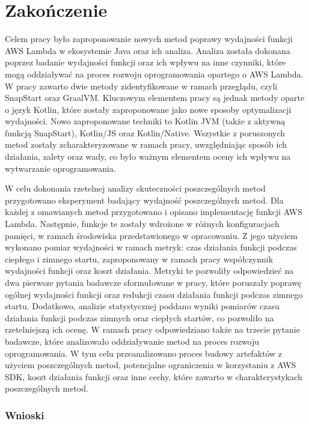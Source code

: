 \chapter*{Zakończenie}\label{chapter:zakonczenie}

Celem pracy było zaproponowanie nowych metod poprawy wydajności funkcji AWS Lambda w ekosystemie Java oraz ich analiza.
Analiza została dokonana poprzez badanie wydajności funkcji oraz ich wpływu na inne czynniki, które mogą oddziaływać na proces rozwoju oprogramowania opartego o AWS Lambda.
W pracy zawarto dwie metody zidentyfikowane w ramach przeglądu, czyli SnapStart oraz GraalVM.
Kluczowym elementem pracy są jednak metody oparte o język Kotlin, które zostały zaproponowane jako nowe sposoby optymalizacji wydajności.
Nowo zaproponowane techniki to Kotlin JVM (także z aktywną funkcją SnapStart), Kotlin/JS oraz Kotlin/Native.
Wszystkie z poruszonych metod zostały zcharakteryzowane w ramach pracy, uwzględniając sposób ich działania, zalety oraz wady, co było ważnym elementem oceny ich wpływu na wytwarzanie oprogramowania.

W celu dokonania rzetelnej analizy skuteczności poszczególnych metod przygotowano eksperyment badający wydajność poszczególnych metod.
Dla każdej z omawianych metod przygotowano i opisano implementację funkcji AWS Lambda.
Następnie, funkcje te zostały wdrożone w różnych konfiguracjach pamięci, w ramach środowiska przedstawionego w opracowaniu.
Z jego użyciem wykonano pomiar wydajności w ramach metryk: czas działania funkcji podczas ciepłego i zimnego startu, zaproponowany w ramach pracy współczynnik wydajności funkcji oraz koszt działania.
Metryki te pozwoliły odpowiedzieć na dwa pierwsze pytania badawcze sformułowane w pracy, które poruszały poprawę ogólnej wydajności funkcji oraz redukcji czasu działania funkcji podczas zimnego startu.
Dodatkowo, analizie statystycznej poddano wyniki pomiarów czasu działania funkcji podczas zimnych oraz ciepłych startów, co pozwoliło na rzetelniejszą ich ocenę.
W ramach pracy odpowiedziano także na trzecie pytanie badawcze, które analizowało oddziaływanie metod na proces rozwoju oprogramowania.
W tym celu przeanalizowano proces budowy artefaktów z użyciem poszczególnych metod, potencjalne ograniczenia w korzystaniu z AWS SDK, koszt działania funkcji oraz inne cechy, które zawarto w charakterystykach poszczególnych metod.

\subsection*{Wnioski}

